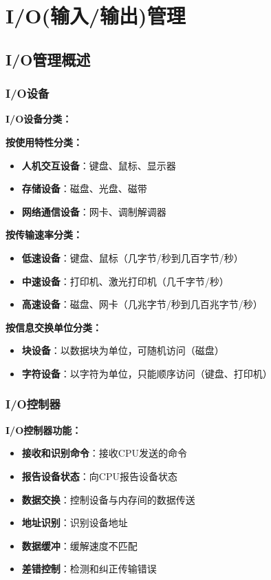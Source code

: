 \documentclass[lang=cn,newtx,10pt,scheme=chinese]{../../elegantbook}
\begin{document}
\chapter{I/O(输入/输出)管理}


\section{I/O管理概述}

\subsection{I/O设备}

\textbf{I/O设备分类：}

\textbf{按使用特性分类：}
\begin{itemize}
  \item \textbf{人机交互设备}：键盘、鼠标、显示器
  \item \textbf{存储设备}：磁盘、光盘、磁带
  \item \textbf{网络通信设备}：网卡、调制解调器
\end{itemize}

\textbf{按传输速率分类：}
\begin{itemize}
  \item \textbf{低速设备}：键盘、鼠标（几字节/秒到几百字节/秒）
  \item \textbf{中速设备}：打印机、激光打印机（几千字节/秒）
  \item \textbf{高速设备}：磁盘、网卡（几兆字节/秒到几百兆字节/秒）
\end{itemize}

\textbf{按信息交换单位分类：}
\begin{itemize}
  \item \textbf{块设备}：以数据块为单位，可随机访问（磁盘）
  \item \textbf{字符设备}：以字符为单位，只能顺序访问（键盘、打印机）
\end{itemize}

\subsection{I/O控制器}

\textbf{I/O控制器功能：}
\begin{itemize}
  \item \textbf{接收和识别命令}：接收CPU发送的命令
  \item \textbf{报告设备状态}：向CPU报告设备状态
  \item \textbf{数据交换}：控制设备与内存间的数据传送
  \item \textbf{地址识别}：识别设备地址
  \item \textbf{数据缓冲}：缓解速度不匹配
  \item \textbf{差错控制}：检测和纠正传输错误
\end{itemize}
\end{document}
